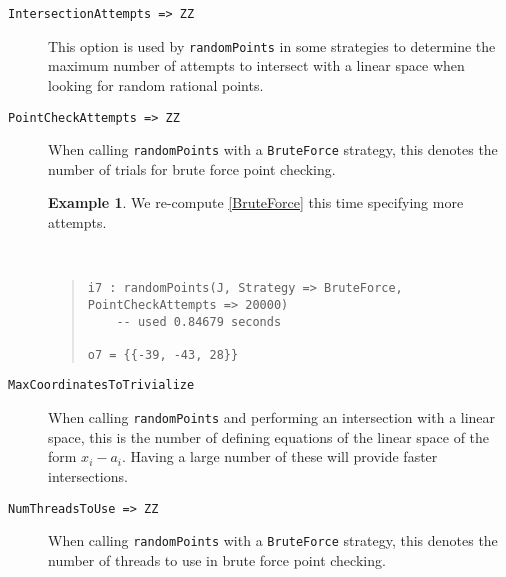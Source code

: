 \documentclass[11pt]{amsart}
\theoremstyle{definition}
\newtheorem{example}{Example}[section]
\begin{document}
\begin{description}
    \item[\tt IntersectionAttempts => ZZ]

    This option is used by {\tt randomPoints} in some strategies to determine the maximum number of attempts to intersect with a linear space when looking for random rational points.  %

    \item[\tt PointCheckAttempts => ZZ]

    When calling {\tt randomPoints} with a {\tt BruteForce} strategy, this denotes the number of trials for brute force point checking.
    
    \begin{example}
        We re-compute \cref{BruteForce} this time specifying more attempts.
    {{\small\color{blue}
    ~~
    \begin{quote}
\begin{verbatim}    
i7 : randomPoints(J, Strategy => BruteForce, PointCheckAttempts => 20000)
    -- used 0.84679 seconds
    
o7 = {{-39, -43, 28}}
    \end{verbatim}%
\end{quote}\vspace{-1em}%
}}%
    \end{example}%
%
    \item[\tt MaxCoordinatesToTrivialize]

    When calling {\tt randomPoints} and performing an intersection with a linear space, this is the number of defining equations of the linear space of the form $x_i - a_i$.  Having a large number of these will provide faster intersections.
    
    \item[\tt NumThreadsToUse => ZZ]

    When calling {\tt randomPoints} with a {\tt BruteForce} strategy, this denotes the number of threads to use in brute force point checking.
    \end{description}
\end{document}
